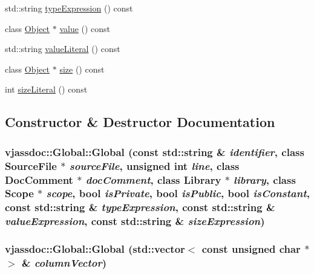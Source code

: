 \begin{CompactItemize}
\item 
std::string \hyperlink{classvjassdoc_1_1Global_fd1b0ad435dae30a0e44f472baf11b25}{typeExpression} () const 
\item 
class \hyperlink{classvjassdoc_1_1Object}{Object} $\ast$ \hyperlink{classvjassdoc_1_1Global_1dd411e17e0b5090990571d73459e2a5}{value} () const 
\item 
std::string \hyperlink{classvjassdoc_1_1Global_9306c48075e65d76a8324959006ffebb}{valueLiteral} () const 
\item 
class \hyperlink{classvjassdoc_1_1Object}{Object} $\ast$ \hyperlink{classvjassdoc_1_1Global_e3ad49253eccec78bd93e7bd12494303}{size} () const 
\item 
int \hyperlink{classvjassdoc_1_1Global_2029ac82912ebe23066c48e13ab2b1a2}{sizeLiteral} () const 
\end{CompactItemize}


\subsection{Constructor \& Destructor Documentation}
\hypertarget{classvjassdoc_1_1Global_9914271ade5a5e8cd9261a29cbbb9516}{
\subsubsection{\setlength{\rightskip}{0pt plus 5cm}vjassdoc::Global::Global (const std::string \& {\em identifier}, class {\bf SourceFile} $\ast$ {\em sourceFile}, unsigned int {\em line}, class {\bf DocComment} $\ast$ {\em docComment}, class {\bf Library} $\ast$ {\em library}, class {\bf Scope} $\ast$ {\em scope}, bool {\em isPrivate}, bool {\em isPublic}, bool {\em isConstant}, const std::string \& {\em typeExpression}, const std::string \& {\em valueExpression}, const std::string \& {\em sizeExpression})}}
\label{classvjassdoc_1_1Global_9914271ade5a5e8cd9261a29cbbb9516}


\hypertarget{classvjassdoc_1_1Global_4b22573ef7ba055be457713685a7b067}{
\subsubsection{\setlength{\rightskip}{0pt plus 5cm}vjassdoc::Global::Global (std::vector$<$ const unsigned char $\ast$ $>$ \& {\em columnVector})}}
\label{classvjassdoc_1_1Global_4b22573ef7ba055be457713685a7b067}




